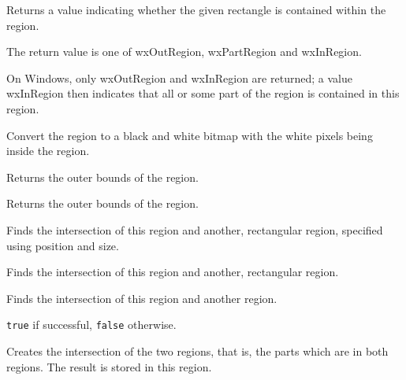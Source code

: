 Returns a value indicating whether the given rectangle is contained within the region.


The return value is one of wxOutRegion, wxPartRegion and wxInRegion.

On Windows, only wxOutRegion and wxInRegion are returned; a value wxInRegion then indicates that
all or some part of the region is contained in this region.


\label{wxregionconverttobitmap}


Convert the region to a black and white bitmap with the white pixels
being inside the region.


\label{wxregiongetbox}


Returns the outer bounds of the region.


Returns the outer bounds of the region.


\label{wxregionintersect}


Finds the intersection of this region and another, rectangular region, specified using position and size.


Finds the intersection of this region and another, rectangular region.


Finds the intersection of this region and another region.


{\tt true} if successful, {\tt false} otherwise.


Creates the intersection of the two regions, that is, the parts which are in both regions. The result
is stored in this region.


\label{wxregionisempty}

